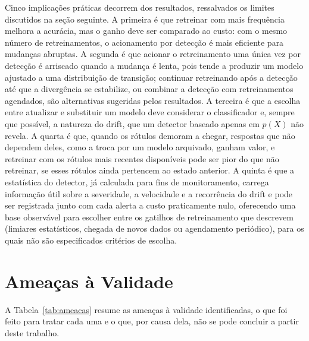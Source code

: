 Cinco implicações práticas decorrem dos resultados, ressalvados os limites
discutidos na seção seguinte. A primeira é que retreinar com mais frequência
melhora a acurácia, mas o ganho deve ser comparado ao custo: com o mesmo
número de retreinamentos, o acionamento por detecção é mais eficiente para
mudanças abruptas. A segunda é que acionar o retreinamento uma única vez por
detecção é arriscado quando a mudança é lenta, pois tende a produzir um
modelo ajustado a uma distribuição de transição; continuar retreinando após
a detecção até que a divergência se estabilize, ou combinar a detecção com
retreinamentos agendados, são alternativas sugeridas pelos resultados. A
terceira é que a escolha entre atualizar e substituir um modelo deve
considerar o classificador e, sempre que possível, a natureza do drift,
que um detector baseado apenas em $p(X)$ não revela. A quarta é que, quando
os rótulos demoram a chegar, respostas que não dependem deles, como a troca
por um modelo arquivado, ganham valor, e retreinar com os rótulos mais
recentes disponíveis pode ser pior do que não retreinar, se esses rótulos
ainda pertencem ao estado anterior. A quinta é que a
estatística do detector, já calculada para fins de monitoramento, carrega
informação útil sobre a severidade, a velocidade e a recorrência do drift e
pode ser registrada junto com cada alerta a custo praticamente nulo,
oferecendo uma base observável para escolher entre os gatilhos de
retreinamento que  descrevem (limiares
estatísticos, chegada de novos dados ou agendamento periódico), para os quais
não são especificados critérios de escolha.

\section{Ameaças à Validade}
\label{sec:ameacas}

A Tabela~\ref{tab:ameacas} resume as ameaças à validade identificadas, o que
foi feito para tratar cada uma e o que, por causa dela, não se pode concluir
a partir deste trabalho.

